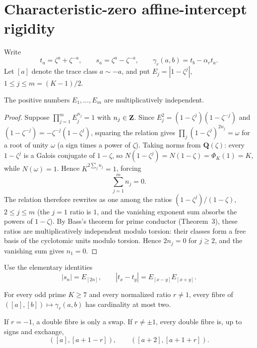 \section{Characteristic-zero affine-intercept rigidity}

Write
\[
t_a=\zeta^a+\zeta^{-a},\qquad
s_a=\zeta^a-\zeta^{-a},\qquad
\gamma_r(a,b)=t_b-\alpha_rt_a.
\]
Let $[a]$ denote the trace class $a\sim-a$, and put
$E_j=|1-\zeta^j|$, $1\le j\le m=(K-1)/2$.

\begin{lemma}\label{lem:bass}
The positive numbers $E_1,\ldots,E_m$ are multiplicatively independent.
\end{lemma}

\begin{proof}
Suppose $\prod_{j=1}^mE_j^{n_j}=1$ with $n_j\in\mathbf Z$.  Since
$E_j^2=(1-\zeta^j)(1-\zeta^{-j})$ and
$(1-\zeta^{-j})=-\zeta^{-j}(1-\zeta^j)$, squaring the relation gives
$\prod_j(1-\zeta^j)^{2n_j}=\omega$ for a root of unity $\omega$ (a sign
times a power of $\zeta$).  Taking norms from $\mathbf Q(\zeta)$: every
$1-\zeta^j$ is a Galois conjugate of $1-\zeta$, so
$N(1-\zeta^j)=N(1-\zeta)=\Phi_K(1)=K$, while $N(\omega)=1$.  Hence
$K^{2\sum_jn_j}=1$, forcing
\[
\sum_{j=1}^mn_j=0.
\]
The relation therefore rewrites as one among the ratios
$(1-\zeta^j)/(1-\zeta)$, $2\le j\le m$ (the $j=1$ ratio is $1$, and the
vanishing exponent sum absorbs the powers of $1-\zeta$).  By Bass's
theorem for prime conductor \cite{Bass1966} (Theorem~3), these ratios are
multiplicatively independent modulo torsion: their classes form a free
basis of the cyclotomic units modulo torsion.  Hence $2n_j=0$ for
$j\ge2$, and the vanishing sum gives $n_1=0$.
\end{proof}

Use the elementary identities
\begin{equation}\label{eq:absfacts}
|s_n|=E_{[2n]},\qquad
|t_x-t_y|=E_{[x-y]}E_{[x+y]}.
\end{equation}

\begin{theorem}\label{thm:intercept}
For every odd prime $K\ge7$ and every normalized ratio $r\ne1$, every fibre of
$([a],[b])\mapsto\gamma_r(a,b)$ has cardinality at most two.

If $r=-1$, a double fibre is only a swap.  If $r\ne\pm1$, every double fibre is,
up to signs and exchange,
\begin{equation}\label{eq:doublefibre}
([a],[a+1-r]),\qquad([a+2],[a+1+r]).
\end{equation}
\end{theorem}

